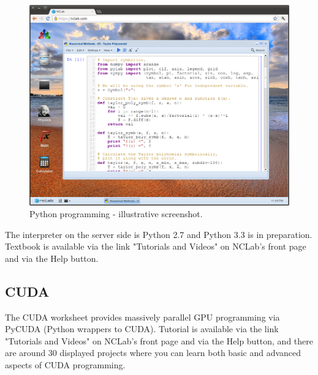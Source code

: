 \documentclass[article,A4,12pt]{llncs}
\begin{document}
\begin{figure}[!ht]
\begin{center}
\includegraphics[width=\textwidth]{img/progr3.png}
\end{center}
\caption{Python programming - illustrative screenshot.}
\label{fig:progr3}
\end{figure}
\noindent
The interpreter on the server side is Python 2.7 and Python 3.3 is in preparation. 
Textbook is available via the link "Tutorials and Videos" on NCLab's front page
and via the Help button. 

\subsection{CUDA}

The CUDA worksheet provides massively parallel GPU programming via PyCUDA (Python 
wrappers to CUDA). Tutorial is available via the link "Tutorials and Videos" 
on NCLab's front page and via the Help button, and there are around 30 
displayed projects where you can learn both basic and advanced aspects of CUDA
programming. 
\end{document}
